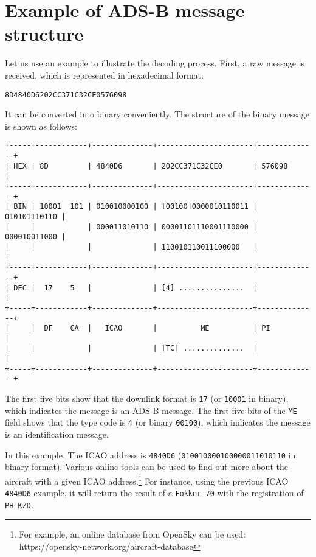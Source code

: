 \section{Example of ADS-B message structure}

Let us use an example to illustrate the decoding process. First, a raw message is received, which is represented in hexadecimal format:

\begin{verbatim}
8D4840D6202CC371C32CE0576098
\end{verbatim}

It can be converted into binary conveniently. The structure of the binary message is shown as follows:

\begin{verbatim}
+-----+------------+--------------+----------------------+--------------+
| HEX | 8D         | 4840D6       | 202CC371C32CE0       | 576098       |
+-----+------------+--------------+----------------------+--------------+
| BIN | 10001  101 | 010010000100 | [00100]0000010110011 | 010101110110 |
|     |            | 000011010110 | 00001101110001110000 | 000010011000 |
|     |            |              | 110010110011100000   |              |
+-----+------------+--------------+----------------------+--------------+
| DEC |  17    5   |              | [4] ...............  |              |
+-----+------------+--------------+----------------------+--------------+
|     |  DF    CA  |   ICAO       |          ME          | PI           |
|     |            |              | [TC] ..............  |              |
+-----+------------+--------------+----------------------+--------------+
\end{verbatim}

The first five bits show that the downlink format is \texttt{17} (or \texttt{10001} in binary), which indicates the message is an ADS-B message. The first five bits of the \texttt{ME} field shows that the type code is \texttt{4} (or binary \texttt{00100}), which indicates the message is an identification message.

In this example, The ICAO address is \texttt{4840D6} (\texttt{010010000100000011010110} in binary format). Various online tools can be used to find out more about the aircraft with a given ICAO address.\footnote{For example, an online database from OpenSky can be used:\\ https://opensky-network.org/aircraft-database} For instance, using the previous ICAO \texttt{4840D6} example, it will return the result of a \texttt{Fokker\ 70} with the registration of \texttt{PH-KZD}.


